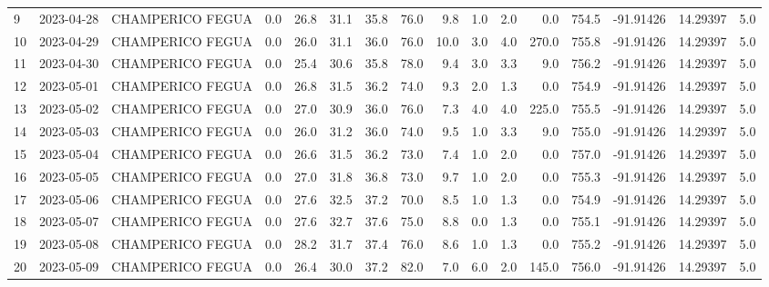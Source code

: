 \documentclass[12pt]{article}
\begin{document}
\begin{center}
\begin{tabular}{lllrrrrrrrrrrrrr}
9   & 2023-04-28 &  CHAMPERICO FEGUA &     0.0 &  26.8 &   31.1 &  35.8 &     76.0 &        9.8 &  1.0 &         2.0 &         0.0 &      754.5 & -91.91426 &  14.29397 &      5.0 \\
10  & 2023-04-29 &  CHAMPERICO FEGUA &     0.0 &  26.0 &   31.1 &  36.0 &     76.0 &       10.0 &  3.0 &         4.0 &       270.0 &      755.8 & -91.91426 &  14.29397 &      5.0 \\
11  & 2023-04-30 &  CHAMPERICO FEGUA &     0.0 &  25.4 &   30.6 &  35.8 &     78.0 &        9.4 &  3.0 &         3.3 &         9.0 &      756.2 & -91.91426 &  14.29397 &      5.0 \\
12  & 2023-05-01 &  CHAMPERICO FEGUA &     0.0 &  26.8 &   31.5 &  36.2 &     74.0 &        9.3 &  2.0 &         1.3 &         0.0 &      754.9 & -91.91426 &  14.29397 &      5.0 \\
13  & 2023-05-02 &  CHAMPERICO FEGUA &     0.0 &  27.0 &   30.9 &  36.0 &     76.0 &        7.3 &  4.0 &         4.0 &       225.0 &      755.5 & -91.91426 &  14.29397 &      5.0 \\
14  & 2023-05-03 &  CHAMPERICO FEGUA &     0.0 &  26.0 &   31.2 &  36.0 &     74.0 &        9.5 &  1.0 &         3.3 &         9.0 &      755.0 & -91.91426 &  14.29397 &      5.0 \\
15  & 2023-05-04 &  CHAMPERICO FEGUA &     0.0 &  26.6 &   31.5 &  36.2 &     73.0 &        7.4 &  1.0 &         2.0 &         0.0 &      757.0 & -91.91426 &  14.29397 &      5.0 \\
16  & 2023-05-05 &  CHAMPERICO FEGUA &     0.0 &  27.0 &   31.8 &  36.8 &     73.0 &        9.7 &  1.0 &         2.0 &         0.0 &      755.3 & -91.91426 &  14.29397 &      5.0 \\
17  & 2023-05-06 &  CHAMPERICO FEGUA &     0.0 &  27.6 &   32.5 &  37.2 &     70.0 &        8.5 &  1.0 &         1.3 &         0.0 &      754.9 & -91.91426 &  14.29397 &      5.0 \\
18  & 2023-05-07 &  CHAMPERICO FEGUA &     0.0 &  27.6 &   32.7 &  37.6 &     75.0 &        8.8 &  0.0 &         1.3 &         0.0 &      755.1 & -91.91426 &  14.29397 &      5.0 \\
19  & 2023-05-08 &  CHAMPERICO FEGUA &     0.0 &  28.2 &   31.7 &  37.4 &     76.0 &        8.6 &  1.0 &         1.3 &         0.0 &      755.2 & -91.91426 &  14.29397 &      5.0 \\
20  & 2023-05-09 &  CHAMPERICO FEGUA &     0.0 &  26.4 &   30.0 &  37.2 &     82.0 &        7.0 &  6.0 &         2.0 &       145.0 &      756.0 & -91.91426 &  14.29397 &      5.0 \\

\end{tabular}
\end{center}
\end{document}
